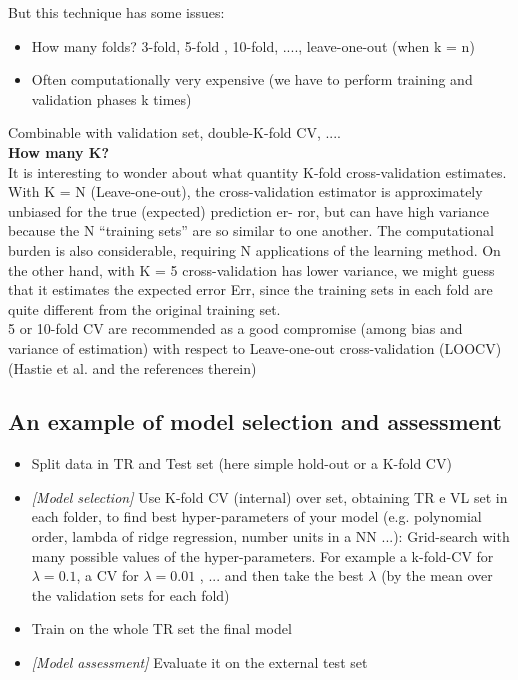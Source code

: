 \documentclass[../main.tex]{subfiles}
\begin{document}
But this technique has some issues: 
\begin{itemize}
    \item How many folds? 3-fold, 5-fold , 10-fold, ...., leave-one-out (when k = n)
    \item Often computationally very expensive (we have to perform training and validation phases k times)
\end{itemize}

Combinable with validation set, double-K-fold CV, ....\\

\noindent\textbf{How many K?}\\
It is interesting to wonder about what quantity K-fold cross-validation estimates. With K = N (Leave-one-out), the cross-validation estimator is approximately unbiased for the true (expected) prediction er- ror, but can have high variance because the N “training sets” are so similar to one another. The computational burden is also considerable, requiring N applications of the learning method. On the other hand, with K = 5  cross-validation has lower variance, we might guess that it estimates the expected error Err, since the training sets in each fold are quite different from the original training set.\\

5 or 10-fold CV are recommended as a good compromise (among bias and variance of estimation) with respect to Leave-one-out cross-validation (LOOCV) (Hastie et al. and
the references therein)

\subsection{An example of model selection and assessment}
\begin{itemize}
    \item Split data in TR and Test set (here simple hold-out or a K-fold CV)

    \item \textit{[Model selection]} Use K-fold CV (internal) over set, obtaining TR e VL set in each folder, to find best hyper-parameters of your model (e.g. polynomial order, lambda of ridge regression, number units in a NN ...): Grid-search with many possible values of the hyper-parameters. For example a k-fold-CV for $\lambda = 0.1$, a CV for $\lambda =0.01$ , ... and then take the best $\lambda$ (by the mean over the validation sets for each fold)
    
    \item Train on the whole TR set the final model
    
    \item \textit{[Model assessment]} Evaluate it on the external test set
\end{itemize}
\end{document}
